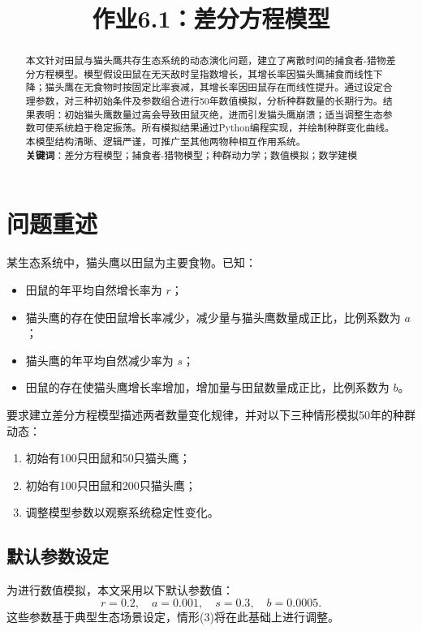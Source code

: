 \documentclass[12pt]{ctexart}
\title{作业6.1：差分方程模型}
\author{}
\date{}
\begin{document}
\maketitle

\begin{abstract}
本文针对田鼠与猫头鹰共存生态系统的动态演化问题，建立了离散时间的捕食者-猎物差分方程模型。模型假设田鼠在无天敌时呈指数增长，其增长率因猫头鹰捕食而线性下降；猫头鹰在无食物时按固定比率衰减，其增长率因田鼠存在而线性提升。通过设定合理参数，对三种初始条件及参数组合进行50年数值模拟，分析种群数量的长期行为。结果表明：初始猫头鹰数量过高会导致田鼠灭绝，进而引发猫头鹰崩溃；适当调整生态参数可使系统趋于稳定振荡。所有模拟结果通过Python编程实现，并绘制种群变化曲线。本模型结构清晰、逻辑严谨，可推广至其他两物种相互作用系统。
\\[0.5em]
\textbf{关键词}：差分方程模型；捕食者-猎物模型；种群动力学；数值模拟；数学建模
\end{abstract}

\section{问题重述}
某生态系统中，猫头鹰以田鼠为主要食物。已知：
\begin{itemize}
    \item 田鼠的年平均自然增长率为 $r$；
    \item 猫头鹰的存在使田鼠增长率减少，减少量与猫头鹰数量成正比，比例系数为 $a$；
    \item 猫头鹰的年平均自然减少率为 $s$；
    \item 田鼠的存在使猫头鹰增长率增加，增加量与田鼠数量成正比，比例系数为 $b$。
\end{itemize}
要求建立差分方程模型描述两者数量变化规律，并对以下三种情形模拟50年的种群动态：
\begin{enumerate}
    \item 初始有100只田鼠和50只猫头鹰；
    \item 初始有100只田鼠和200只猫头鹰；
    \item 调整模型参数以观察系统稳定性变化。
\end{enumerate}

\subsection*{默认参数设定}
为进行数值模拟，本文采用以下默认参数值：
\[
r = 0.2,\quad a = 0.001,\quad s = 0.3,\quad b = 0.0005.
\]
这些参数基于典型生态场景设定，情形(3)将在此基础上进行调整。
\end{document}
